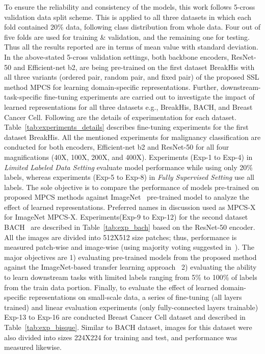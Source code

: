 \documentclass[conference]{IEEEtran}
\begin{document}
To ensure the reliability and consistency of the models, this work follows 5-cross validation data split scheme. This is applied to all three datasets in which each fold contained 20\% data, following class distribution from whole data. Four out of five folds are used for training \& validation, and the remaining one for testing. Thus all the results reported are in terms of mean value with standard deviation.
In the above-stated 5-cross validation settings, both backbone encoders, ResNet-50 and Efficient-net b2, are being pre-trained on the first dataset BreakHis with all three variants (ordered pair, random pair, and fixed pair) of the proposed SSL method MPCS for learning domain-specific representations. Further, downstream-task-specific fine-tuning experiments are carried out to investigate the impact of learned representations for all three datasets e.g., BreakHis, BACH, and Breast Cancer Cell. 
Following are the details of experimentation for each dataset.
Table~\ref{tab:experiments_details} describes fine-tuning experiments for the first dataset BreakHis. All the mentioned experiments for malignancy classification are conducted for both encoders, Efficient-net b2 and ResNet-50 for all four magnifications (40X, 100X, 200X, and 400X). Experiments (Exp-1 to Exp-4) in \textit{Limited Labeled Data Setting} evaluate model performance while using only 20\% labels, whereas experiments (Exp-5 to Exp-8) in \textit{Fully Supervised Setting} use all labels. The sole objective is to compare the performance of models pre-trained on proposed MPCS methods against ImageNet~\cite{deng2009imagenet} pre-trained model to analyze the effect of learned representations. Preferred names in discussion used as MPCS-X for ImageNet  MPCS-X.
Experiments(Exp-9 to Exp-12) for the second dataset BACH~\cite{aresta2019bach} are described in Table~\ref{tab:exp_bach} based on the ResNet-50 encoder. All the images are divided into 512X512 size patches; thus, performance is measured patch-wise and image-wise (using majority voting suggested in~\cite{vesal2018classification}). The major objectives are 1) evaluating pre-trained models from the proposed method against the ImageNet-based transfer learning approach~\cite{aresta2019bach} 2) evaluating the ability to learn downstream tasks with limited labels ranging from 5\% to 100\% of labels from the train data portion.
Finally, to evaluate the effect of learned domain-specific representations on small-scale data, a series of fine-tuning (all layers trained) and linear evaluation experiments (only fully-connected layers trainable) Exp-13 to Exp-16 are conducted Breast Cancer Cell dataset and described in Table~\ref{tab:exp_bisque}. Similar to BACH dataset, images for this dataset were also divided into sizes 224X224 for training and test, and performance was measured likewise.
\end{document}
